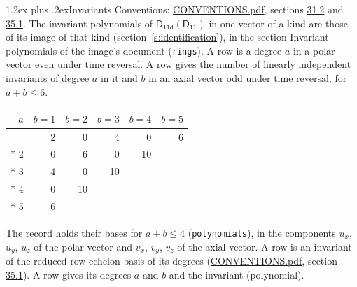 \documentclass[10pt,a4paper]{article}
\makeatletter
\renewcommand\section{\@startsection{section}{1}{\z@}{-3ex plus -1ex minus -.2ex}%
  {1.2ex plus .2ex}{\normalfont\large\sffamily\bfseries\color{parttitle}}}
\numberwithin{equation}{section}
\newcommand{\grp}[1]{\mathsf{#1}}
\makeatother
\begin{document}
\section{Invariants}\label{s:invariants}
Conventions: \href{../../CONVENTIONS.pdf}{CONVENTIONS.pdf}, sections \href{../../CONVENTIONS.pdf\#conv.31.2}{31.2} and \href{../../CONVENTIONS.pdf\#conv.35.1}{35.1}.
The invariant polynomials of $\grp{D_{11d}}(\grp{D_{11}})$ in one vector of a kind are those of its image of that kind (section~\ref{s:identification}), in the section Invariant polynomials of the image's document (\texttt{rings}).
\leavevmode\label{n:index.degree.polar}\label{n:index.degree.axial}A row is a degree $a$ in a polar vector even under time reversal. A row gives the number of linearly independent invariants of degree $a$ in it and $b$ in an axial vector odd under time reversal, for $a + b \le 6$.
{\small\begin{longtable}{@{}rrrrrr@{}}\toprule
$a$ & $b = 1$ & $b = 2$ & $b = 3$ & $b = 4$ & $b = 5$\\\midrule\endhead
\bottomrule\endfoot\endlastfoot
1 & 2 & 0 & 4 & 0 & 6\\*
2 & 0 & 6 & 0 & 10 & \\*
3 & 4 & 0 & 10 &  & \\*
4 & 0 & 10 &  &  & \\*
5 & 6 &  &  &  & \\
\bottomrule\end{longtable}}
\leavevmode\label{n:local.component.polar}\label{n:local.component.axial}The record holds their bases for $a + b \le 4$ (\texttt{polynomials}), in the components $u_{x}$, $u_{y}$, $u_{z}$ of the polar vector and $v_{x}$, $v_{y}$, $v_{z}$ of the axial vector. \label{n:head.polynomial}A row is an invariant of the reduced row echelon basis of its degrees (\href{../../CONVENTIONS.pdf}{CONVENTIONS.pdf}, section \href{../../CONVENTIONS.pdf\#conv.35.1}{35.1}). A row gives its degrees $a$ and $b$ and the invariant (polynomial).
\end{document}
